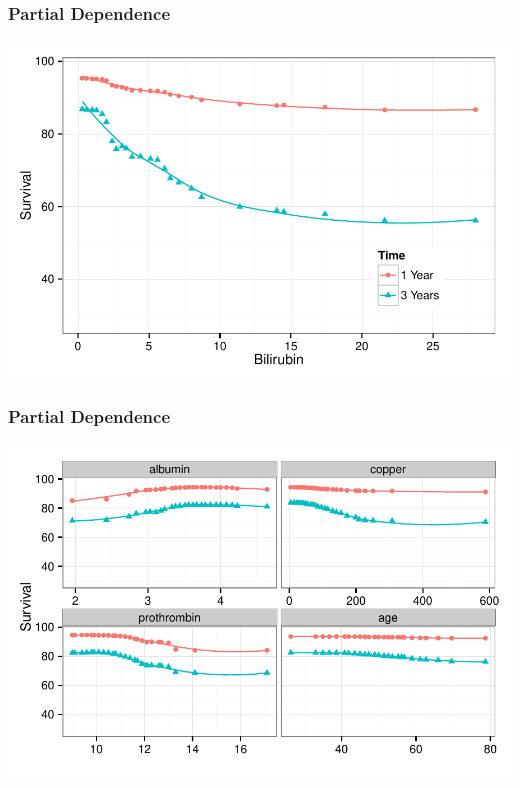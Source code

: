 \documentclass[xcolor=svgnames]{beamer}\usepackage[]{graphicx}\usepackage[]{color}
\newenvironment{knitrout}{}{} %
\begin{document}
\begin{frame}
\frametitle{Partial Dependence}

\begin{knitrout}\footnotesize
{}\color{fgcolor}

{\centering \includegraphics[width=.9\linewidth]{figures/pbc-partial-1} 

}



\end{knitrout}
\end{frame}
\begin{frame}
\frametitle{Partial Dependence}
\begin{knitrout}\footnotesize
{}\color{fgcolor}

{\centering \includegraphics[width=.9\linewidth]{figures/partialpanel-1} 

}



\end{knitrout}
\end{frame}
\end{document}
